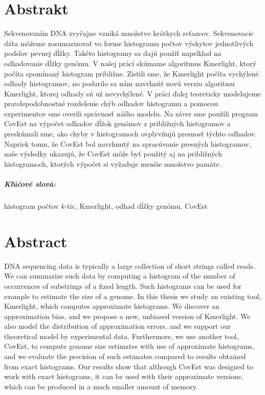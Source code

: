 \documentclass[12pt, oneside]{book}
\begin{document}
\chapter*{Abstrakt}
Sekvenovaním DNA zvyčajne vzniká množstvo krátkych reťazcov. 
Sekvenovacie dáta môžeme zosumarizovať vo forme histogramu počtov výskytov jednotlivých
podslov pevnej dĺžky. Takéto histogramy sa dajú použiť napríklad na odhadovanie dĺžky 
genómu. V našej práci skúmame algoritmus Kmerlight, ktorý počíta spomínaný histogram približne.
Zistili sme, že Kmerlight počíta vychýlené odhady histogramov, no podarilo sa nám navrhnúť 
novú verziu algoritmu Kmerlight, ktorej odhady sú už nevychýlené. V práci ďalej teoreticky 
modelujeme pravdepodobnostné rozdelenie chýb odhadov histogramu a pomocou experimentov 
sme overili správnosť nášho modelu. Na záver sme použili program CovEst 
na výpočet odhadov dĺžok genómov z približných histogramov a preskúmali sme, ako
chyby v histogramoch ovplyvňujú presnosť týchto odhadov. Napriek tomu, že CovEst bol
navrhnutý na spracúvanie presných histogramov, naše výsledky ukazujú, že CovEst môže byť použitý
aj na približných histogramoch, ktorých výpočet si vyžaduje menšie množstvo pamäte.


\paragraph*{Kľúčové slová:} histogram počtov $k$-tic, Kmerlight, odhad dĺžky genómu, CovEst


\newpage 
\chapter*{Abstract}

DNA sequencing data is typically a large collection of short strings called reads.
We can summarize such data by computing a histogram of the number of occurrences of substrings of 
a fixed length. Such histograms can be used for example to estimate the size of a genome. 
In this thesis we study an existing tool, Kmerlight, which
computes approximate histograms. We discover an approximation bias, and we propose
a new, unbiased version of Kmerlight. We also model the distribution of approximation
errors, and we support our theoretical model by experimental data. Furthermore, we use another
tool, CovEst, to compute genome size estimates with use of approximate histograms, and 
we evaluate the precision of such estimates compared to results obtained from exact histograms.
Our results show that although CovEst was designed to work with exact histograms,
it can be used with their approximate versions, which can be produced in a much smaller amount of
memory.
\end{document}
